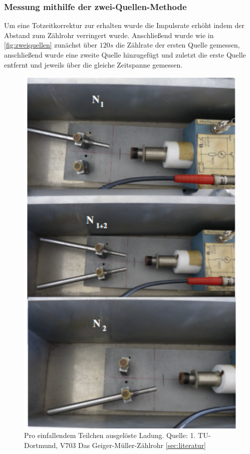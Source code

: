 \subsubsection{Messung mithilfe der zwei-Quellen-Methode}
Um eine Totzeitkorrektur zur erhalten wurde die Impulsrate erhöht indem der Abstand zum Zählrohr verringert 
wurde. Anschließend wurde wie in \autoref{fig:zweiquellen} zunächst über $120s$  die Zählrate der ersten Quelle gemessen, anschließend wurde 
eine zweite Quelle hinzugefügt und zuletzt die erste Quelle entfernt und jeweils über die gleiche Zeitspanne 
gemessen.
\begin{figure}
    \centering
    \includegraphics{Zweiquellenmethode.pdf}
    \caption{Pro einfallendem Teilchen ausgelöste Ladung. Quelle: 1. TU-Dortmund, V703 Das Geiger-Müller-Zählrohr
    \autoref{sec:literatur}}
    \label{fig:zweiquellen}
  \end{figure}